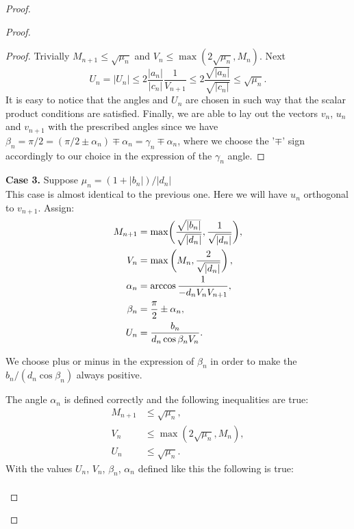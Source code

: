 \documentclass[12pt]{amsart}
\theoremstyle{case}
\begin{document}
\begin{proof}
\begin{proof}
\begin{proof}
            Trivially $M_{n+1} \leq \sqrt{\mu_n}$ and $V_n \leq \max(2\sqrt{\mu_n}, M_n)$. Next
            \[
              U_n = |U_n| \leq 2 \frac{|a_n|}{|c_n|} \frac{1}{V_{n+1}} \leq 2 \frac{\sqrt{|a_n|}}{\sqrt{|c_n|}} \leq \sqrt{\mu_n}.
            \]
            It is easy to notice that the angles and $U_n$ are chosen in such way that the scalar product conditions are 
              satisfied.
            Finally, we are able to lay out the vectors $v_n$, $u_n$ and $v_{n+1}$ with the prescribed angles 
              since we have $\beta_n = \pi/2 = (\pi/2 \pm \alpha_n) \mp \alpha_n = \gamma_n \mp \alpha_n$,
              where we choose the '$\mp$' sign accordingly to our choice in the expression of the $\gamma_n$ angle.
          \end{proof}
        \noindent\textbf{Case 3.} Suppose $\mu_n = (1 + |b_n|)/|d_n|$\\
          This case is almost identical to the previous one.
          Here we will have $u_n$ orthogonal to $v_{n+1}$.
          Assign:
          \begin{align*}
            M_{n+1} &= \max\biggl(\smash[t]{\frac{\sqrt{|b_n|}}{\sqrt{|d_n|}}}, \frac{1}{\sqrt{\smash[b]{|d_n|}}}\biggr),\\
            V_n &= \max\left(M_n, \frac{2}{\sqrt{\smash[b]{|d_n|}}}\right),\\
            \alpha_n &= \arccos{\frac{1}{-d_n V_n V_{n+1}}},\\
            \beta_n &= \frac{\pi}{2} \pm \alpha_n,\\
            U_n &= \frac{b_n}{d_n \cos{\beta_n} V_n}.
          \end{align*}
          \begin{remark*}
            We choose plus or minus in the expression of $\beta_n$ in order to make the $b_n/(d_n \cos{\beta_n})$ always positive.
          \end{remark*}
          \begin{prop}
              The angle $\alpha_n$ is defined correctly and the following inequalities are true:
              \begin{align*}
                M_{n+1} &\leq \sqrt{\mu_n},\\
                V_n &\leq \max(2\sqrt{\mu_n}, M_n),\\
                U_n &\leq \sqrt{\mu_n}.
              \end{align*}
              With the values $U_n$, $V_n$, $\beta_n$, $\alpha_n$ defined like this the following is true:
              \begin{align*}

\end{align*}
\end{prop}
\end{proof}
\end{proof}
\end{document}
